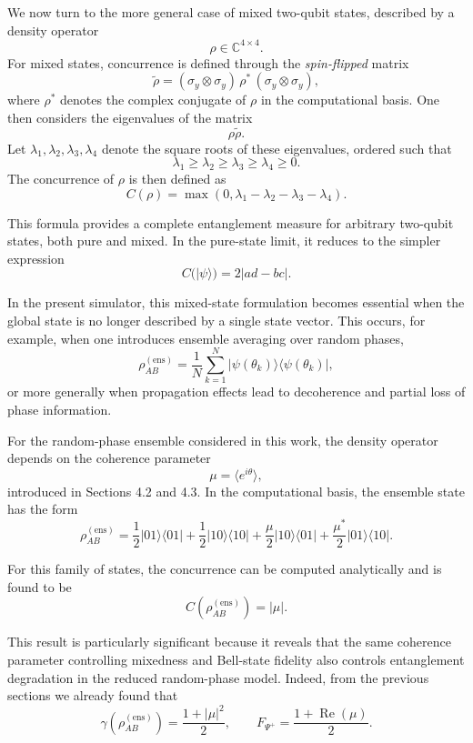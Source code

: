 \documentclass[a4paper]{article}
\begin{document}
\medskip

We now turn to the more general case of mixed two-qubit states, described by a density operator
\[
\rho \in \mathbb{C}^{4\times 4}.
\]
For mixed states, concurrence is defined through the \emph{spin-flipped} matrix
\[
\tilde{\rho}
=
(\sigma_y \otimes \sigma_y)\,\rho^*\,(\sigma_y \otimes \sigma_y),
\]
where \(\rho^*\) denotes the complex conjugate of \(\rho\) in the computational basis. One then considers the eigenvalues of the matrix
\[
\rho \tilde{\rho}.
\]
Let \(\lambda_1,\lambda_2,\lambda_3,\lambda_4\) denote the square roots of these eigenvalues, ordered such that
\[
\lambda_1 \ge \lambda_2 \ge \lambda_3 \ge \lambda_4 \ge 0.
\]
The concurrence of \(\rho\) is then defined as
\[
C(\rho)
=
\max\!\left(0,\lambda_1-\lambda_2-\lambda_3-\lambda_4\right).
\]

This formula provides a complete entanglement measure for arbitrary two-qubit states, both pure and mixed. In the pure-state limit, it reduces to the simpler expression
\[
C(|\psi\rangle)=2|ad-bc|.
\]

\medskip

In the present simulator, this mixed-state formulation becomes essential when the global state is no longer described by a single state vector. This occurs, for example, when one introduces ensemble averaging over random phases,
\[
\rho_{AB}^{(\mathrm{ens})}
=
\frac{1}{N}
\sum_{k=1}^{N}
|\psi(\theta_k)\rangle\langle\psi(\theta_k)|,
\]
or more generally when propagation effects lead to decoherence and partial loss of phase information.

For the random-phase ensemble considered in this work, the density operator depends on the coherence parameter
\[
\mu = \langle e^{i\theta}\rangle,
\]
introduced in Sections 4.2 and 4.3. In the computational basis, the ensemble state has the form
\[
\rho_{AB}^{(\mathrm{ens})}
=
\frac{1}{2}|01\rangle\langle 01|
+
\frac{1}{2}|10\rangle\langle 10|
+
\frac{\mu}{2}|10\rangle\langle 01|
+
\frac{\mu^*}{2}|01\rangle\langle 10|.
\]

For this family of states, the concurrence can be computed analytically and is found to be
\[
C\!\left(\rho_{AB}^{(\mathrm{ens})}\right) = |\mu|.
\]

This result is particularly significant because it reveals that the same coherence parameter controlling mixedness and Bell-state fidelity also controls entanglement degradation in the reduced random-phase model. Indeed, from the previous sections we already found that
\[
\gamma\!\left(\rho_{AB}^{(\mathrm{ens})}\right)
=
\frac{1+|\mu|^2}{2},
\qquad
F_{\Psi^+}
=
\frac{1+\operatorname{Re}(\mu)}{2}.
\]
\end{document}
